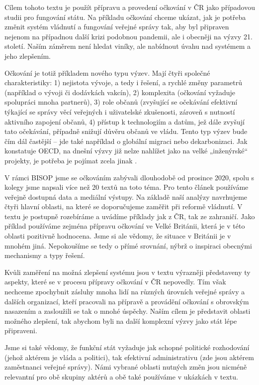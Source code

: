 Cílem tohoto textu je použít přípravu a provedení očkování v ČR jako případovou studii pro fungování státu. Na příkladu očkování chceme ukázat, jak je potřeba změnit systém vládnutí a fungování veřejné správy tak, aby byl připraven nejenom na případnou další krizi podobnou pandemii, ale i obecněji na výzvy 21. století. Naším záměrem není hledat viníky, ale nabídnout úvahu nad systémem a jeho zlepšením.


Očkování je totiž příkladem nového typu výzev. Mají čtyři společné charakteristiky: 1) nejistota vývoje, a tedy i řešení, a rychlé změny parametrů (například o vývoji či dodávkách vakcín), 2) komplexita (očkování vyžaduje spolupráci mnoha partnerů), 3) role občanů (zvyšující se očekávání efektivní týkající se správy věcí veřejných i uživatelské zkušenosti, zároveň s nutností aktivního zapojení občanů, 4) přístup k technologiím a datům, jež dále zvyšují tato očekávání, případně snižují důvěru občanů ve vládu. Tento typ výzev bude čím dál častější -- jde také například o globální migraci nebo dekarbonizaci. Jak konstatuje OECD, na dnešní výzvy již nelze nahlížet jako na velké „inženýrské“ projekty, je potřeba je pojímat zcela jinak \cite{oecd_public_governance_reviews_skills_2020}.


V rámci BISOP jsme se očkováním zabývali dlouhodobě od prosince 2020, spolu s kolegy jsme napsali více než 20 textů na toto téma. Pro tento článek používáme veřejně dostupná data a mediální výstupy. Na základě naší analýzy navrhujeme čtyři hlavní oblasti, na které se doporučujeme zaměřit při reformě vládnutí. V textu je postupně rozebíráme a uvádíme příklady jak z ČR, tak ze zahraničí. Jako příklad používáme zejména přípravu očkování ve Velké Británii, která je v této oblasti pozitivně hodnocena. Jsme si ale vědomy, že situace v Británii je v mnohém jiná. Nepokoušíme se tedy o přímé srovnání, nýbrž o inspiraci obecnými mechanismy a typy řešení.


Kvůli zaměření na možná zlepšení systému jsou v textu výrazněji představeny ty aspekty, které se v procesu přípravy očkování v ČR nepovedly. Tím však nechceme zpochybnit zásluhy mnoha lidí na různých úrovních veřejné správy a dalších organizací, kteří pracovali na přípravě a provádění očkování s obrovským nasazením a zasloužili se tak o mnohé úspěchy. Naším cílem je představit oblasti možného zlepšení, tak abychom byli na další komplexní výzvy jako stát lépe připraveni.

Jsme si také vědomy, že funkční stát vyžaduje jak schopné politické rozhodování (jehož aktérem je vláda a politici), tak efektivní administrativu (zde jsou aktérem zaměstnanci veřejné správy). Námi vybrané oblasti nutných změn jsou nicméně relevantní pro obě skupiny aktérů a obě také používáme v ukázkách v textu. 

